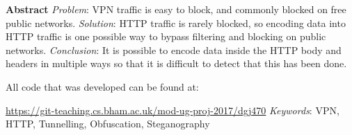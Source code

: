 {\huge\textbf{Abstract}}
\vspace{0.7cm}
\newline
\textit{Problem}: VPN traffic is easy to block, and commonly blocked on free public networks.
\vspace{0.4cm}
\newline
\textit{Solution}: HTTP traffic is rarely blocked, so encoding data into HTTP traffic is one possible way to bypass filtering and blocking on public networks.
\vspace{0.4cm}
\newline
\textit{Conclusion}: It is possible to encode data inside the HTTP body and headers in multiple ways so that it is difficult to detect that this has been done.\par
\vspace{0.4cm}
All code that was developed can be found at:\par
\url{https://git-teaching.cs.bham.ac.uk/mod-ug-proj-2017/dgj470}
\vspace{0.5cm}
\newline
\textit{Keywords}: VPN, HTTP, Tunnelling, Obfuscation, Steganography

